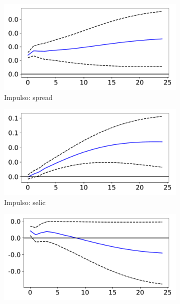 \documentclass[a4paper,
               article,
               12pt,
               openany,
               oneside,
               english,
               brazil]{abntex2}
\numberwithin{equation}{section}
\begin{document}
    \begin{figure}[h!bt]
        \label{irf_spread_ortogonal}
        \caption{Função de impulso-resposta ortogonal (spread)}
        \begin{subfigure}[t]{.5\linewidth}
            \includegraphics[width = \textwidth, scale=1]{irf/orth_spread_spread.pdf}
            \caption{Impulso: spread}
        \end{subfigure}
        \begin{subfigure}[t]{.5\linewidth}
            \includegraphics[width = \textwidth, scale=1]{irf/orth_spread_selic.pdf}
            \caption{Impulso: selic}
        \end{subfigure}
        \begin{subfigure}[t]{.5\linewidth}
            \includegraphics[width = \textwidth, scale=1]{irf/orth_spread_inad.pdf}

\end{subfigure}
\end{figure}
\end{document}
